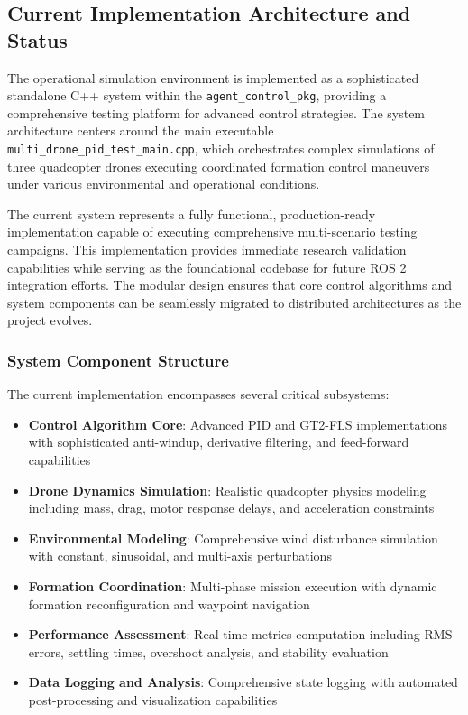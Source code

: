 \subsection*{Current Implementation Architecture and Status}

The operational simulation environment is implemented as a sophisticated standalone C++ system within the \texttt{agent\_control\_pkg}, providing a comprehensive testing platform for advanced control strategies. The system architecture centers around the main executable \texttt{multi\_drone\_pid\_test\_main.cpp}, which orchestrates complex simulations of three quadcopter drones executing coordinated formation control maneuvers under various environmental and operational conditions.

The current system represents a fully functional, production-ready implementation capable of executing comprehensive multi-scenario testing campaigns. This implementation provides immediate research validation capabilities while serving as the foundational codebase for future ROS 2 integration efforts. The modular design ensures that core control algorithms and system components can be seamlessly migrated to distributed architectures as the project evolves.

\subsubsection*{System Component Structure}

The current implementation encompasses several critical subsystems:

\begin{itemize}
    \item \textbf{Control Algorithm Core}: Advanced PID and GT2-FLS implementations with sophisticated anti-windup, derivative filtering, and feed-forward capabilities
    \item \textbf{Drone Dynamics Simulation}: Realistic quadcopter physics modeling including mass, drag, motor response delays, and acceleration constraints
    \item \textbf{Environmental Modeling}: Comprehensive wind disturbance simulation with constant, sinusoidal, and multi-axis perturbations
    \item \textbf{Formation Coordination}: Multi-phase mission execution with dynamic formation reconfiguration and waypoint navigation
    \item \textbf{Performance Assessment}: Real-time metrics computation including RMS errors, settling times, overshoot analysis, and stability evaluation
    \item \textbf{Data Logging and Analysis}: Comprehensive state logging with automated post-processing and visualization capabilities
\end{itemize}

